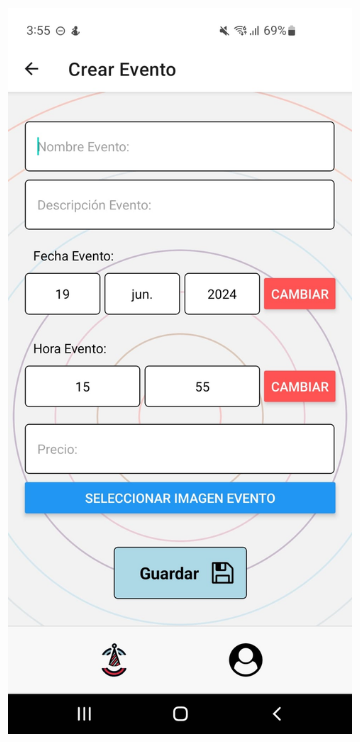 \clearpage
\vspace*{\fill}
\begin{figure}[H]
    \centering
    \begin{subfigure}{0.45\textwidth}
        \centering
        \includegraphics[width=\linewidth]{imagenes/Capturas/CrearEvento.jpeg}

\end{subfigure}
\end{figure}
